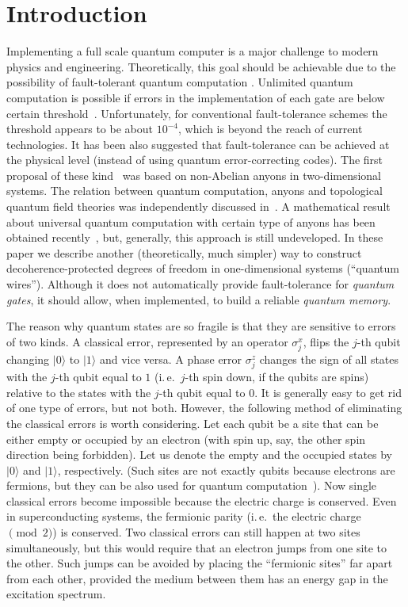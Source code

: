 \section*{Introduction}

Implementing a full scale quantum computer is a major challenge to modern
physics and engineering. Theoretically, this goal should be achievable due to
the possibility of fault-tolerant quantum computation \cite{Shor}. Unlimited
quantum computation is possible if errors in the implementation of each gate
are below certain threshold~\cite{AB1,AB2,KLZ,Kit1}. Unfortunately, for
conventional fault-tolerance schemes the threshold appears to be about
$10^{-4}$, which is beyond the reach of current technologies. It has been also
suggested that fault-tolerance can be achieved at the physical level (instead
of using quantum error-correcting codes). The first proposal of these
kind~\cite{Kit2} was based on non-Abelian anyons in two-dimensional systems.
The relation between quantum computation, anyons and topological quantum field
theories was independently discussed in~\cite{Freedman}. A mathematical result
about universal quantum computation with certain type of anyons has been
obtained recently~\cite{FLW}, but, generally, this approach is still
undeveloped. In these paper we describe another (theoretically, much simpler)
way to construct decoherence-protected degrees of freedom in one-dimensional
systems (``quantum wires''). Although it does not automatically provide
fault-tolerance for {\em quantum gates}, it should allow, when implemented, to
build a reliable {\em quantum memory}.

The reason why quantum states are so fragile is that they are sensitive to
errors of two kinds. A classical error, represented by an operator
$\sigma^x_j$, flips the $j$-th qubit changing $|0\rangle$ to $|1\rangle$ and
vice versa. A phase error $\sigma^z_j$ changes the sign of all states with the
$j$-th qubit equal to $1$ (i.\,e.\ $j$-th spin down, if the qubits are spins)
relative to the states with the $j$-th qubit equal to $0$. It is generally
easy to get rid of one type of errors, but not both. However, the following
method of eliminating the classical errors is worth considering.  Let each
qubit be a site that can be either empty or occupied by an electron (with spin
up, say, the other spin direction being forbidden). Let us denote the empty
and the occupied states by $|0\rangle$ and $|1\rangle$, respectively. (Such
sites are not exactly qubits because electrons are fermions, but they can be
also used for quantum computation~\cite{BK}). Now single classical errors
become impossible because the electric charge is conserved. Even in
superconducting systems, the fermionic parity (i.\,e.\ the electric
charge$\pmod{2}$) is conserved. Two classical errors can still happen at two
sites simultaneously, but this would require that an electron jumps from one
site to the other. Such jumps can be avoided by placing the ``fermionic
sites'' far apart from each other, provided the medium between them has an
energy gap in the excitation spectrum.

